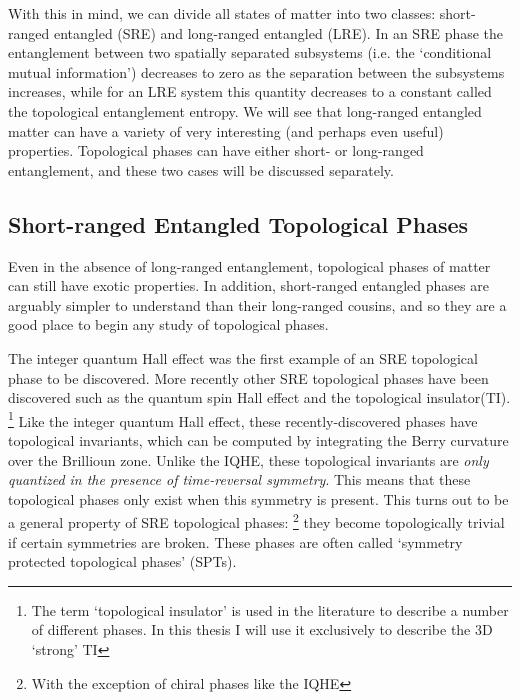 With this in mind, we can divide all states of matter into two classes: short-ranged entangled (SRE) and long-ranged entangled (LRE). 
In an SRE phase the entanglement between two spatially separated subsystems (i.e. the `conditional mutual information'\cite{TurnerVishwanath2013}) decreases to zero as the separation between the subsystems increases, while for an LRE system this quantity decreases to a constant called the topological entanglement entropy\cite{KitaevPreskill,LevinWen}. We will see that long-ranged entangled matter can have a variety of very interesting (and perhaps even useful) properties. Topological phases can have either short- or long-ranged entanglement, and these two cases will be discussed separately.

\subsection{Short-ranged Entangled Topological Phases}

Even in the absence of long-ranged entanglement, topological phases of matter can still have exotic properties. In addition, short-ranged entangled phases are arguably simpler to understand than their long-ranged cousins, and so they are a good place to begin any study of topological phases.

The integer quantum Hall effect was the first example of an SRE topological phase to be discovered. More recently other SRE topological phases have been discovered such as the quantum spin Hall effect\cite{QSHEreview} and the topological insulator(TI).\cite{KaneHasanRMP,QiZhangRMP}
\footnote{The term `topological insulator' is used in the literature to describe a number of different phases. In this thesis I will use it exclusively to describe the 3D `strong' TI}
Like the integer quantum Hall effect, these recently-discovered phases have topological invariants, which can be computed by integrating the Berry curvature over the Brillioun zone. Unlike the IQHE, these topological invariants are \emph{only quantized in the presence of time-reversal symmetry}. This means that these topological phases only exist when this symmetry is present. This turns out to be a general property of SRE topological phases:
\footnote{With the exception of chiral phases like the IQHE}
 they become topologically trivial if certain symmetries are broken. These phases are often called `symmetry protected topological phases' (SPTs).

